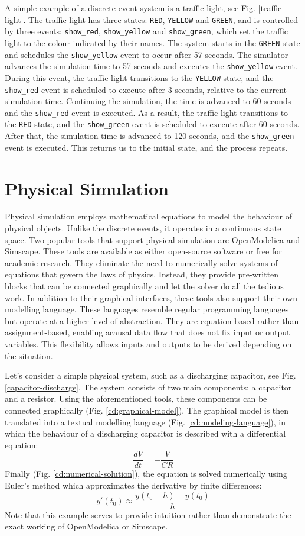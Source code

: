 \documentclass[conference]{IEEEtran}
\begin{document}
A simple example of a discrete-event system is a traffic light, see Fig. \ref{traffic-light}.
The traffic light has three states: \texttt{RED}, \texttt{YELLOW} and \texttt{GREEN},
and is controlled by three events: \texttt{show\_red}, \texttt{show\_yellow} and \texttt{show\_green}, which set the traffic light to the colour indicated by their names.
The system starts in the \texttt{GREEN} state and schedules the \texttt{show\_yellow} event to occur after 57 seconds.
The simulator advances the simulation time to 57 seconds and executes the \texttt{show\_yellow} event.
During this event, the traffic light transitions to the \texttt{YELLOW} state, and the \texttt{show\_red} event is scheduled to execute after 3 seconds, relative to the current simulation time.
Continuing the simulation, the time is advanced to 60 seconds and the \texttt{show\_red} event is executed.
As a result, the traffic light transitions to the \texttt{RED} state, and the \texttt{show\_green} event is scheduled to execute after 60 seconds.
After that, the simulation time is advanced to 120 seconds, and the \texttt{show\_green} event is executed.
This returns us to the initial state, and the process repeats.

\section{Physical Simulation}

Physical simulation employs mathematical equations to model the behaviour of physical objects.
Unlike the discrete events, it operates in a continuous state space.
Two popular tools that support physical simulation are OpenModelica and Simscape.
These tools are available as either open-source software or free for academic research.
They eliminate the need to numerically solve systems of equations that govern the laws of physics.
Instead, they provide pre-written blocks that can be connected graphically and let the solver do all the tedious work.
In addition to their graphical interfaces, these tools also support their own modelling language. These languages resemble regular programming languages but operate at a higher level of abstraction.
They are equation-based rather than assignment-based, enabling acausal data flow that does not fix input or output variables.
This flexibility allows inputs and outputs to be derived depending on the situation.

Let's consider a simple physical system, such as a discharging capacitor, see Fig. \ref{capacitor-discharge}.
The system consists of two main components: a capacitor and a resistor.
Using the aforementioned tools, these components can be connected graphically (Fig. \ref{cd:graphical-model}).
The graphical model is then translated into a textual modelling language (Fig. \ref{cd:modeling-language}), in which the behaviour of a discharging capacitor is described with a differential equation:
\[
\frac{dV}{dt} = -\frac{V}{CR}
\]
Finally (Fig. \ref{cd:numerical-solution}), the equation is solved numerically using Euler's method which approximates the derivative by finite differences:
\[
y'(t_0) \approx \frac{y(t_0+h) - y(t_0)}{h}
\]
Note that this example serves to provide intuition rather than demonstrate the exact working of OpenModelica or Simscape.
\end{document}
